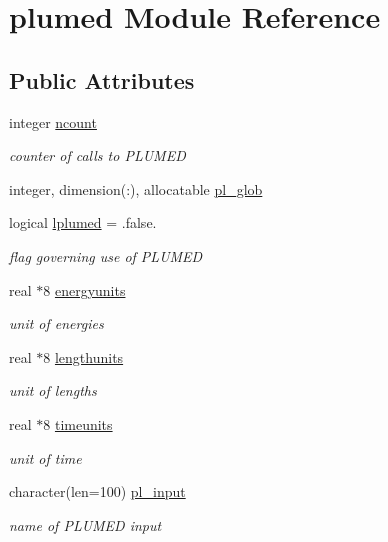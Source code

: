 \hypertarget{classplumed}{\section{plumed Module Reference}
\label{classplumed}
}
\subsection*{Public Attributes}
\begin{DoxyCompactItemize}
\item 
integer \hyperlink{classplumed_a48a97baaf97158b7283ced58dc4642b1}{ncount}
\begin{DoxyCompactList}\small\item\em counter of calls to P\-L\-U\-M\-E\-D \end{DoxyCompactList}\item 
integer, dimension(\-:), allocatable \hyperlink{classplumed_a4f45b852b65341ea5c02adc73a3e5858}{pl\-\_\-glob}
\item 
logical \hyperlink{classplumed_ac1262f9bab62ea649ff431d0623adcdc}{lplumed} = .false.
\begin{DoxyCompactList}\small\item\em flag governing use of P\-L\-U\-M\-E\-D \end{DoxyCompactList}\item 
real $\ast$8 \hyperlink{classplumed_a65158efb6a21a8b9c6de94dbd23376ab}{energyunits}
\begin{DoxyCompactList}\small\item\em unit of energies \end{DoxyCompactList}\item 
real $\ast$8 \hyperlink{classplumed_a6373fbd65916ce8d4398fea166a10674}{lengthunits}
\begin{DoxyCompactList}\small\item\em unit of lengths \end{DoxyCompactList}\item 
real $\ast$8 \hyperlink{classplumed_acc5066451b15cf08b371e5384f5ca7ff}{timeunits}
\begin{DoxyCompactList}\small\item\em unit of time \end{DoxyCompactList}\item 
character(len=100) \hyperlink{classplumed_aedc087d82d6aa6aa260cd90dfd428051}{pl\-\_\-input}
\begin{DoxyCompactList}\small\item\em name of P\-L\-U\-M\-E\-D input \end{DoxyCompactList}\item 

\end{DoxyCompactItemize}
